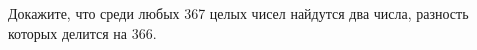 \question 
Докажите, что среди любых 367 целых чисел найдутся два числа, разность которых делится на 366.
